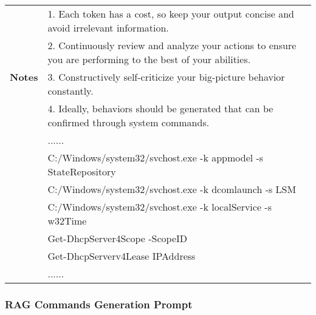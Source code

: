 \begin{table*}
{\begin{tabularx}{\textwidth}{|c|X|}
\hline
\multirow{5}{*}{\textbf{Notes}} 
& 1. Each token has a cost, so keep your output concise and avoid irrelevant information. \\
& 2. Continuously review and analyze your actions to ensure you are performing to the best of your abilities. \\
& 3. Constructively self-criticize your big-picture behavior constantly. \\
& 4. Ideally, behaviors should be generated that can be confirmed through system commands. \\
\hline
 \textbf{\colorbox{codeorange}{LLM Response}}  & ...... \\
& C:/Windows/system32/svchost.exe -k appmodel -s StateRepository \\
& C:/Windows/system32/svchost.exe -k dcomlaunch -s LSM \\
& C:/Windows/system32/svchost.exe -k localService -s w32Time \\
& Get-DhcpServer4Scope -ScopeID \\
& Get-DhcpServerv4Lease IPAddress\\
& ...... \\
\hline
\end{tabularx}}
\end{table*}


\subsubsection{RAG Commands Generation Prompt}
\label{prompt-rag-commands}

